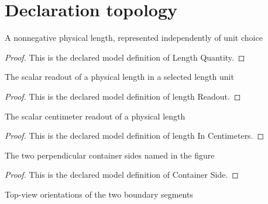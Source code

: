 \section{Declaration topology}
\begin{definition}
  \label{def:physics:phyx-mini-0072:phyxminiproblems-problemphyxmini0072-lengthquantity}
  A nonnegative physical length, represented independently of unit choice
\end{definition}
\begin{proof}
  This is the declared model definition of Length Quantity.
\end{proof}
\begin{definition}
  \label{def:physics:phyx-mini-0072:phyxminiproblems-problemphyxmini0072-lengthreadout}
  The scalar readout of a physical length in a selected length unit
\end{definition}
\begin{proof}
  This is the declared model definition of length Readout.
\end{proof}
\begin{definition}
  \label{def:physics:phyx-mini-0072:phyxminiproblems-problemphyxmini0072-lengthincentimeters}
  The scalar centimeter readout of a physical length
\end{definition}
\begin{proof}
  This is the declared model definition of length In Centimeters.
\end{proof}
\begin{definition}
  \label{def:physics:phyx-mini-0072:phyxminiproblems-problemphyxmini0072-containerside}
  The two perpendicular container sides named in the figure
\end{definition}
\begin{proof}
  This is the declared model definition of Container Side.
\end{proof}
\begin{definition}
  \label{def:physics:phyx-mini-0072:phyxminiproblems-problemphyxmini0072-boundaryorientation}
  Top-view orientations of the two boundary segments
\end{definition}
